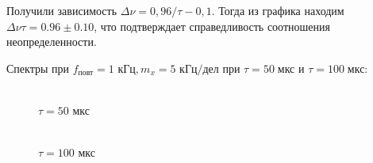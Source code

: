 \documentclass[a4paper, 12pt]{article}
\begin{document}
Получили зависимость $ \Delta \nu = 0,96/\tau-0,1$. Тогда из графика находим $\Delta \nu \tau = 0.96 \pm 0.10$, что подтверждает справедливость соотношения неопределенности.

Спектры при $f_{\text{повт}} = 1 \text{ кГц}, m_x = 5 \text{ кГц/дел}$ при $\tau = 50 \; \text{мкс}$ и $\tau = 100 \; \text{мкс}$:\\

\begin{figure}[h]
	\begin{minipage}[h]{0.5\linewidth}
		 \\$\tau= 50$ мкс
	\end{minipage}
	\begin{minipage}[h]{0.5\linewidth}
		 \\$\tau= 100$ мкс
	\end{minipage}
\end{figure}
\end{document}

